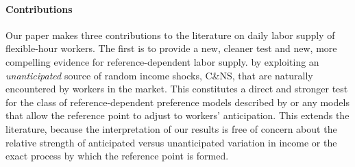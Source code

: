 \documentclass[reviewmode,AEJ]{AEA}
\begin{document}

\paragraph{Contributions} 
Our paper makes three contributions to the literature on daily labor supply 
of flexible-hour workers. The first is to provide a new, cleaner test 
and new, more compelling evidence for reference-dependent labor supply. 
by exploiting an \textit{unanticipated} source of random income shocks, C\&NS, that are naturally encountered by workers
in the market. This constitutes a direct and stronger test for the
class of reference-dependent preference models described by \citet{kHoszegi2006model} or any models that 
allow the reference point to adjust to workers' anticipation. This extends the literature, because the
interpretation of our results is free of concern about the relative strength of anticipated versus 
unanticipated variation in income or the exact process by which the reference point is formed.
\end{document}
